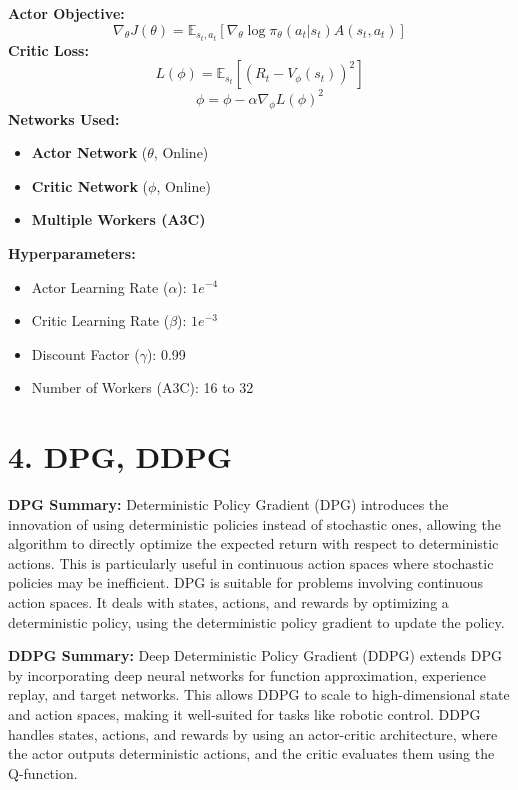 \documentclass[a4paper,10pt]{article}
\begin{document}
\begin{multicols}{2}
\noindent \textbf{Actor Objective:}
\[
\nabla_\theta J(\theta) = \mathbb{E}_{s_t, a_t} \left[ \nabla_\theta \log \pi_\theta(a_t | s_t) A(s_t, a_t) \right]
\]
\textbf{Critic Loss:}
\[
L(\phi) = \mathbb{E}_{s_t} \left[ \left( R_t - V_\phi(s_t) \right)^2 \right]
\]
\[
\phi = \phi - \alpha \nabla_\phi L(\phi)^2
\]
\textbf{Networks Used:}
\begin{itemize}
    \item \textbf{Actor Network} (\(\theta\), Online)
    \item \textbf{Critic Network} (\(\phi\), Online)
    \item \textbf{Multiple Workers (A3C)}
\end{itemize}
\textbf{Hyperparameters:}
\begin{itemize}
    \item Actor Learning Rate (\(\alpha\)): \(1e^{-4}\)
    \item Critic Learning Rate (\(\beta\)): \(1e^{-3}\)
    \item Discount Factor (\(\gamma\)): 0.99
    \item Number of Workers (A3C): 16 to 32
\end{itemize}

\section*{4. DPG, DDPG}
\textbf{DPG Summary:} Deterministic Policy Gradient (DPG) introduces the innovation of using deterministic policies instead of stochastic ones, allowing the algorithm to directly optimize the expected return with respect to deterministic actions. This is particularly useful in continuous action spaces where stochastic policies may be inefficient. DPG is suitable for problems involving continuous action spaces. It deals with states, actions, and rewards by optimizing a deterministic policy, using the deterministic policy gradient to update the policy.

\noindent \textbf{DDPG Summary:} Deep Deterministic Policy Gradient (DDPG) extends DPG by incorporating deep neural networks for function approximation, experience replay, and target networks. This allows DDPG to scale to high-dimensional state and action spaces, making it well-suited for tasks like robotic control. DDPG handles states, actions, and rewards by using an actor-critic architecture, where the actor outputs deterministic actions, and the critic evaluates them using the Q-function.


\end{multicols}
\end{document}
